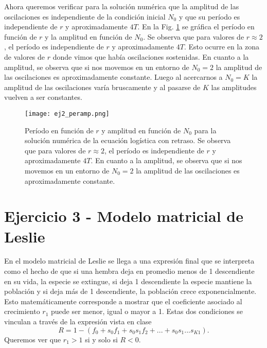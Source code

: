 \documentclass[letterpaper,12pt]{article}
\theoremstyle{plain}
\begin{document}
Ahora queremos verificar para la solución numérica que la amplitud de las oscilaciones es independiente de la condición inicial $N_0$ y que su período es independiente de $r$ y aproximadamente $4T$. En la Fig. \ref{fig:ej2_peramp} se gráfica el período en función de $r$ y la amplitud en función de $N_0$. Se observa que para valores de $r \approx 2$, el período es independiente de $r$ y aproximadamente $4T$. Esto ocurre en la zona de valores de $r$ donde vimos que había oscilaciones sostenidas. En cuanto a la amplitud, se observa que si nos movemos en un entorno de $N_0 = 2$ la amplitud de las oscilaciones es aproximadamente constante. Luego al acercarnos a $N_0 = K$ la amplitud de las oscilaciones varía bruscamente y al pasarse de $K$ las amplitudes vuelven a ser constantes.

\begin{figure}[h]
    \centering
    \texttt{[image: ej2\_peramp.png]}
    \caption{ Período en función de $r$ y amplitud en función de $N_0$ para la solución numérica de la ecuación logística con retraso. Se observa que para valores de $r \approx 2$, el período es independiente de $r$ y aproximadamente $4T$. En cuanto a la amplitud, se observa que si nos movemos en un entorno de $N_0 = 2$ la amplitud de las oscilaciones es aproximadamente constante.} 
    \label{fig:ej2_peramp}
\end{figure}

\section*{Ejercicio 3 - Modelo matricial de Leslie}

En el modelo matricial de Leslie se llega a una expresión final que se interpreta como el hecho de que si una hembra deja en promedio menos de 1 descendiente en su vida, la especie se extingue, si deja 1 descendiente la especie mantiene la población y si deja más de 1 descendiente, la población crece exponencialmente. Esto matemáticamente corresponde a mostrar que el coeficiente asociado al crecimiento $r_1$ puede ser menor, igual o mayor a 1. Estas dos condiciones se vinculan a través de la expresión vista en clase 
\begin{equation}
    R = 1 - (f_0 + s_0f_1 + s_0s_1f_2 + ... + s_0s_1 ... s_{K1}).
\end{equation}
Queremos ver que $r_1 > 1$ si y solo si $R < 0$.
\end{document}
